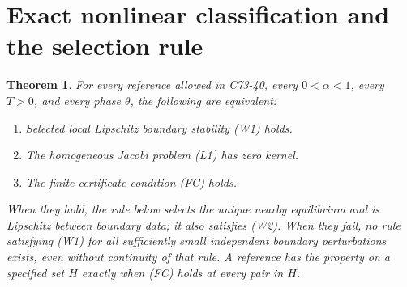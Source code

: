 \documentclass[11pt,a4paper]{article}
\newtheorem{theorem}{Theorem}
\begin{document}
\section{Exact nonlinear classification and the selection rule}
\begin{theorem}\label{classification}
For every reference allowed in C73-40, every $0<\alpha<1$, every
$T>0$, and every phase $\theta$, the following are equivalent:
\begin{enumerate}
\item Selected local Lipschitz boundary stability (W1) holds.
\item The homogeneous Jacobi problem (L1) has zero kernel.
\item The finite-certificate condition (FC) holds.
\end{enumerate}
When they hold, the rule below selects the unique nearby equilibrium
and is Lipschitz between boundary data; it also satisfies (W2).
When they fail, no rule satisfying (W1) for all sufficiently small
independent boundary perturbations exists, even without continuity
of that rule. A reference has the property on a specified set $H$
exactly when (FC) holds at every pair in $H$.
\end{theorem}
\end{document}
